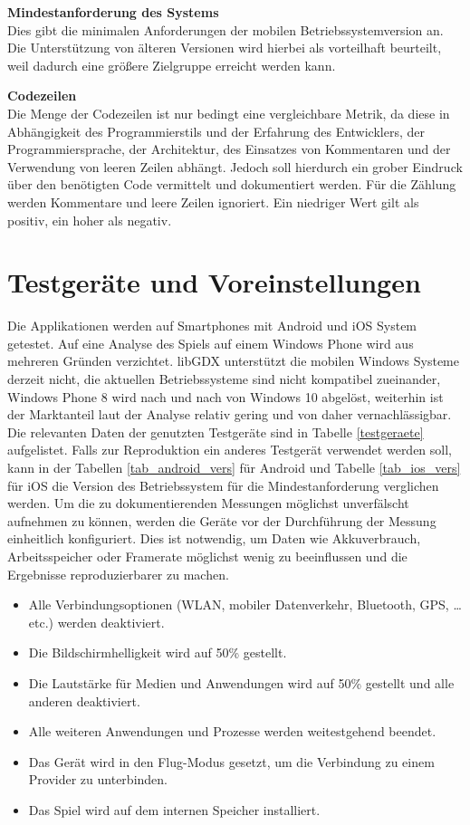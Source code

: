 \bigskip
\textbf{Mindestanforderung des Systems} \\
Dies gibt die minimalen Anforderungen der mobilen Betriebssystemversion an. Die Unterstützung von älteren Versionen wird hierbei als vorteilhaft beurteilt, weil dadurch eine größere Zielgruppe erreicht werden kann.

\bigskip
\textbf{Codezeilen} \\
Die Menge der Codezeilen ist nur bedingt eine vergleichbare Metrik, da diese in Abhängigkeit des Programmierstils und der Erfahrung des Entwicklers, der Programmiersprache, der Architektur, des Einsatzes von Kommentaren und der Verwendung von leeren Zeilen abhängt.  Jedoch soll hierdurch ein grober Eindruck über den benötigten Code vermittelt und dokumentiert werden. Für die Zählung werden Kommentare und leere Zeilen ignoriert. Ein niedriger Wert gilt als positiv, ein hoher als negativ.


\section{Testgeräte und Voreinstellungen}
Die Applikationen werden auf Smartphones mit Android und iOS System getestet. Auf eine Analyse des Spiels auf einem Windows Phone wird aus mehreren Gründen verzichtet. libGDX unterstützt die mobilen Windows Systeme derzeit nicht, die aktuellen Betriebssysteme sind nicht kompatibel zueinander, Windows Phone 8 wird nach und nach von Windows 10 abgelöst, weiterhin ist der Marktanteil laut der Analyse relativ gering und von daher vernachlässigbar. Die relevanten Daten der genutzten Testgeräte sind in Tabelle \ref{testgeraete} aufgelistet. Falls zur Reproduktion ein anderes Testgerät verwendet werden soll, kann in der Tabellen \ref{tab_android_vers} für Android und Tabelle  \ref{tab_ios_vers} für iOS die Version des Betriebssystem für die Mindestanforderung verglichen werden. Um die zu dokumentierenden Messungen möglichst unverfälscht aufnehmen zu können, werden die Geräte vor der Durchführung der Messung einheitlich konfiguriert. Dies ist notwendig, um Daten wie Akkuverbrauch, Arbeitsspeicher oder Framerate möglichst wenig zu beeinflussen und die Ergebnisse reproduzierbarer zu machen. 

\begin{itemize}
	\item Alle Verbindungsoptionen (WLAN, mobiler Datenverkehr, Bluetooth, GPS, …etc.) werden deaktiviert.
	\item Die Bildschirmhelligkeit wird auf 50\% gestellt.
	\item Die Lautstärke für Medien und Anwendungen wird auf 50\% gestellt und alle anderen deaktiviert.
	\item Alle weiteren Anwendungen und Prozesse werden weitestgehend beendet.
	\item Das Gerät wird in den Flug-Modus gesetzt, um die Verbindung zu einem Provider zu unterbinden.
	\item Das Spiel wird auf dem internen Speicher installiert.
\end{itemize}

